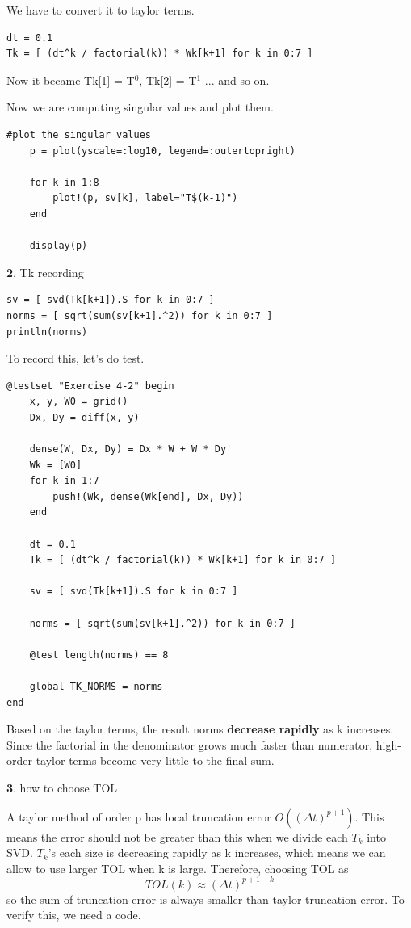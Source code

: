 \documentclass[11pt]{article}
\begin{document}
We have to convert it to taylor terms.

\begin{lstlisting}
dt = 0.1
Tk = [ (dt^k / factorial(k)) * Wk[k+1] for k in 0:7 ]
\end{lstlisting}

Now it became Tk[1] = T$^{0}$, Tk[2] = T$^{1}$ ... and so on.

Now we are computing singular values and plot them.

\begin{lstlisting}
#plot the singular values
    p = plot(yscale=:log10, legend=:outertopright)

    for k in 1:8
        plot!(p, sv[k], label="T$(k-1)")
    end

    display(p)
\end{lstlisting}
\vspace{1.5em}
\textbf{2}. Tk recording

\begin{lstlisting}
sv = [ svd(Tk[k+1]).S for k in 0:7 ]
norms = [ sqrt(sum(sv[k+1].^2)) for k in 0:7 ]
println(norms)
\end{lstlisting}

To record this, let's do test.
\begin{lstlisting}
@testset "Exercise 4-2" begin
    x, y, W0 = grid()
    Dx, Dy = diff(x, y)

    dense(W, Dx, Dy) = Dx * W + W * Dy'
    Wk = [W0]
    for k in 1:7
        push!(Wk, dense(Wk[end], Dx, Dy))
    end

    dt = 0.1
    Tk = [ (dt^k / factorial(k)) * Wk[k+1] for k in 0:7 ]

    sv = [ svd(Tk[k+1]).S for k in 0:7 ]

    norms = [ sqrt(sum(sv[k+1].^2)) for k in 0:7 ]

    @test length(norms) == 8

    global TK_NORMS = norms
end
\end{lstlisting}

Based on the taylor terms, the result norms \textbf{decrease rapidly} as k increases. Since the factorial in the denominator grows much faster than numerator, high-order taylor terms become very little to the final sum.
\vspace{1.5em}

\textbf{3}. how to choose TOL

A taylor method of order p has local truncation error $O((\Delta t)^{p+1})$. This means the error should not be greater than this when we divide each $T_k$ into SVD. $T_k$'s each size is decreasing rapidly as k increases, which means we can allow to use larger TOL when k is large. Therefore, choosing TOL as 
\[
TOL(k) \approx (\Delta t)^{p+1-k}
\]
so the sum of truncation error is always smaller than taylor truncation error. 
To verify this, we need a code.
\end{document}

